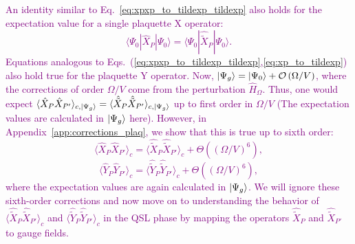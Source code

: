\documentclass[twocolumn,superscriptaddress,amsmath,amssymb,aps,prx,nofootinbib]{revtex4-2}
\newcommand{\newtext}[1]{\textcolor{purple}{#1}}
\begin{document}
\newtext{An identity similar to Eq.~\eqref{eq:xpxp_to_tildexp_tildexp} also holds for the expectation value for a single plaquette X operator:
\begin{equation} \label{eq:xp_to_tildexp}
    \langle \Psi_0 | \hat{X}_P | \Psi_0 \rangle  =  \langle \Psi_0 | \hat{\tilde{X}}_P | \Psi_0 \rangle.
\end{equation}
Equations analogous to Eqs.~(\ref{eq:xpxp_to_tildexp_tildexp},\ref{eq:xp_to_tildexp})
also hold true for the plaquette Y operator. 
Now, $\ket{\Psi_g} = \ket{\Psi_0} + \mathcal{O} \left( \Omega/V \right)$, where the corrections of order $\Omega/V$ come from the perturbation $\hat{H}_\Omega$. Thus, one would expect $ \langle \hat{X}_P \hat{X}_{P'} \rangle_{c, \ket{\Psi_g}} = \langle \hat{\tilde{X}}_P \hat{\tilde{X}}_{P'} \rangle_{c, \ket{\Psi_g}} $ up to first order in $\Omega/V$ (The expectation values are calculated in $\ket{\Psi_g}$ here). However, in Appendix~\ref{app:corrections_plaq}, we show that this is true up to sixth order: 
\begin{equation}\label{eq:sixth_order_x}
    \langle \hat{X}_P \hat{X}_{P'} \rangle_c = \langle \hat{\tilde{X}}_P \hat{\tilde{X}}_{P'} \rangle_c + \Theta\left( \left( \Omega/V \right)^6 \right),
\end{equation}
\begin{equation}\label{eq:sixth_order_y}
    \langle \hat{Y}_P \hat{Y}_{P'} \rangle_c = \langle \hat{\tilde{Y}}_P \hat{\tilde{Y}}_{P'} \rangle_c + \Theta\left( \left( \Omega / V \right)^6 \right), 
\end{equation}
where the expectation values are again calculated in $\ket{\Psi_g}$. We will ignore these sixth-order corrections and now move on to understanding the behavior of $\langle \hat{\tilde{X}}_P \hat{\tilde{X}}_{P'} \rangle_c$ and $ \langle \hat{\tilde{Y}}_P \hat{\tilde{Y}}_{P'} \rangle_c$ in the QSL phase by mapping the operators $\hat{\tilde{X}}_{P}$ and $\hat{\tilde{X}}_{P'}$ to gauge fields. }
\end{document}
